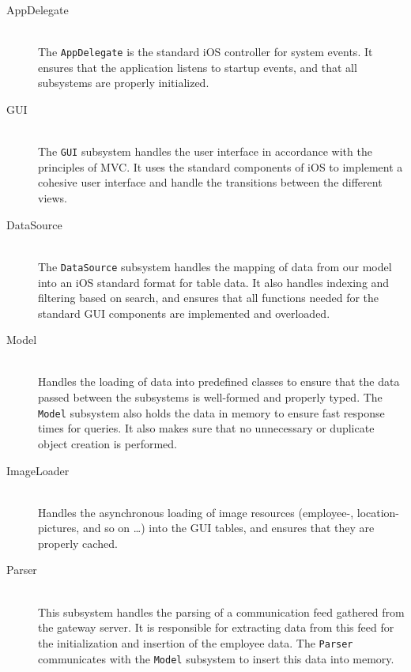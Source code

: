 \begin{description}

    \item[AppDelegate] \hfill \\
        The \texttt{AppDelegate} is the standard iOS controller for system events. It ensures that the
        application listens to startup events, and that all subsystems are properly initialized.

    \item[GUI] \hfill \\
        The \texttt{GUI} subsystem handles the user interface in accordance with the principles of MVC\@.
        It uses the standard components of iOS to implement a cohesive user interface and handle the transitions
        between the different views.

    \item[DataSource] \hfill \\
        The \texttt{DataSource} subsystem handles the mapping of data from our model into
        an iOS standard format for table data. It also handles indexing and filtering based on search,
        and ensures that all functions needed for the standard GUI components are implemented and overloaded.

    \item[Model] \hfill \\
        Handles the loading of data into predefined classes to ensure that the data passed
        between the subsystems is well-formed and properly typed. The \texttt{Model} subsystem also
        holds the data in memory  to ensure fast response times for queries. It also makes sure that no
        unnecessary or duplicate object creation is performed.

    \item[ImageLoader] \hfill \\
        Handles the asynchronous loading of image resources (employee-, location-pictures, and so on \dots)
        into the GUI tables, and ensures that they are properly cached.

    \item[Parser] \hfill \\
        This subsystem handles the parsing of a communication feed gathered from the gateway server.
        It is responsible for extracting data from this feed for the initialization and insertion of
        the employee data. The \texttt{Parser} communicates with the \texttt{Model} subsystem to
        insert this data into memory.


\end{description}
